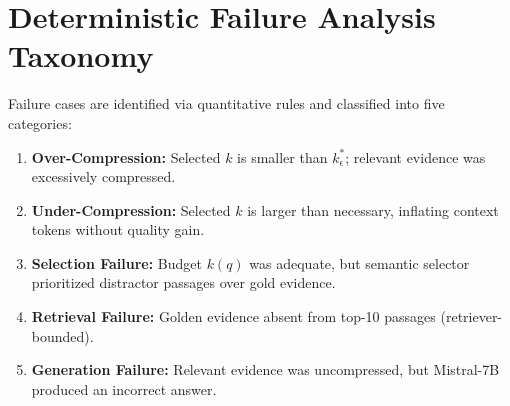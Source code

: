 \documentclass[11pt,a4paper]{article}
\begin{document}
\section{Deterministic Failure Analysis Taxonomy}
Failure cases are identified via quantitative rules and classified into five categories:
\begin{enumerate}
    \item \textbf{Over-Compression:} Selected $k$ is smaller than $k^*_\epsilon$; relevant evidence was excessively compressed.
    \item \textbf{Under-Compression:} Selected $k$ is larger than necessary, inflating context tokens without quality gain.
    \item \textbf{Selection Failure:} Budget $k(q)$ was adequate, but semantic selector prioritized distractor passages over gold evidence.
    \item \textbf{Retrieval Failure:} Golden evidence absent from top-10 passages (retriever-bounded).
    \item \textbf{Generation Failure:} Relevant evidence was uncompressed, but Mistral-7B produced an incorrect answer.
\end{enumerate}
\end{document}
